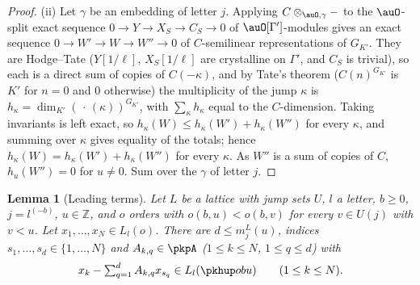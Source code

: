 \documentclass[10pt]{amsart}
\newtheorem{lemma}[theorem]{Lemma}
\theoremstyle{definition}
\theoremstyle{remark}
\newcommand{\Z}{\mathbb Z}
\begin{document}
\begin{proof}
(ii) Let $\gamma$ be an embedding of letter $j$. Applying $C\otimes_{\auO,\gamma}-$ to the $\auO$-split exact
sequence $0\to Y\to X_S\to C_S\to0$ of $\auO[\Gamma']$-modules gives an exact sequence $0\to W'\to W\to W''\to0$
of $C$-semilinear representations of $G_{K'}$. They are Hodge--Tate ($Y[1/\ell]$, $X_S[1/\ell]$ are
crystalline on $\Gamma'$, and $C_S$ is trivial), so each is a direct sum of copies of $C(-\kappa)$, and by
Tate's theorem ($C(n)^{G_{K'}}$ is $K'$ for $n=0$ and $0$ otherwise) the multiplicity of the jump $\kappa$ is
$h_\kappa=\dim_{K'}(\,\cdot\,(\kappa))^{G_{K'}}$, with $\sum_\kappa h_\kappa$ equal to the $C$-dimension. Taking
invariants is left exact, so $h_\kappa(W)\le h_\kappa(W')+h_\kappa(W'')$ for every $\kappa$, and summing over
$\kappa$ gives equality of the totals; hence $h_\kappa(W)=h_\kappa(W')+h_\kappa(W'')$ for every $\kappa$. As
$W''$ is a sum of copies of $C$, $h_u(W'')=0$ for $u\ne0$. Sum over the $\gamma$ of letter $j$.
\end{proof}

\begin{lemma}[Leading terms]\label{pkh:lead}
Let $L$ be a lattice with jump sets $U$, $l$ a letter, $b\ge0$, $j=l^{(-b)}$, $u\in\Z$, and $o$ orders with
$o(b,u)<o(b,v)$ for every $v\in U(j)$ with $v<u$. Let $x_1,\dots,x_N\in L_l(o)$. There are $d\le m^L_j(u)$,
indices $s_1,\dots,s_d\in\{1,\dots,N\}$ and $A_{k,q}\in\pkpA$ ($1\le k\le N$, $1\le q\le d$) with
\[
x_k-\textstyle\sum_{q=1}^dA_{k,q}x_{s_q}\in L_l(\pkhup obu)\qquad(1\le k\le N).
\]
\end{lemma}
\end{document}
